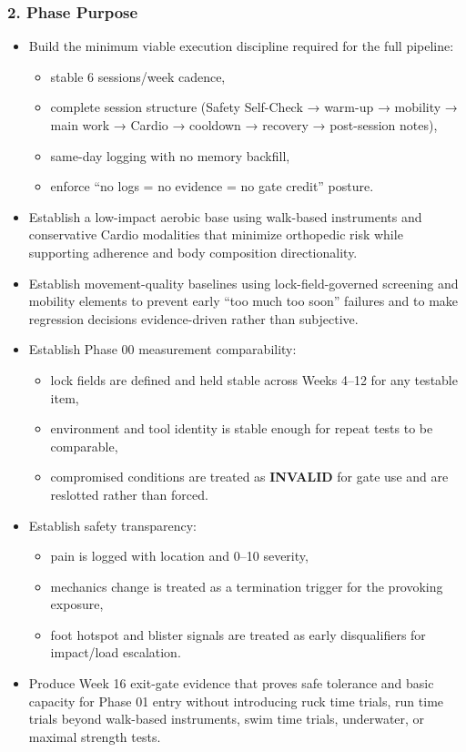 \documentclass[10pt]{article}
\begin{document}
\subsubsection*{2. Phase Purpose}

\begin{itemize}
\item Build the minimum viable execution discipline required for the full pipeline:
  \begin{itemize}
  \item stable 6 sessions/week cadence,
  \item complete session structure (Safety Self-Check → warm-up → mobility → main work → Cardio → cooldown → recovery → post-session notes),
  \item same-day logging with no memory backfill,
  \item enforce “no logs = no evidence = no gate credit” posture.
  \end{itemize}

\item Establish a low-impact aerobic base using walk-based instruments and conservative Cardio modalities that minimize orthopedic risk while supporting adherence and body composition directionality.

\item Establish movement-quality baselines using lock-field-governed screening and mobility elements to prevent early “too much too soon” failures and to make regression decisions evidence-driven rather than subjective.

\item Establish Phase 00 measurement comparability:
  \begin{itemize}
  \item lock fields are defined and held stable across Weeks 4–12 for any testable item,
  \item environment and tool identity is stable enough for repeat tests to be comparable,
  \item compromised conditions are treated as \textbf{INVALID} for gate use and are reslotted rather than forced.
  \end{itemize}

\item Establish safety transparency:
  \begin{itemize}
  \item pain is logged with location and 0–10 severity,
  \item mechanics change is treated as a termination trigger for the provoking exposure,
  \item foot hotspot and blister signals are treated as early disqualifiers for impact/load escalation.
  \end{itemize}

\item Produce Week 16 exit-gate evidence that proves safe tolerance and basic capacity for Phase 01 entry without introducing ruck time trials, run time trials beyond walk-based instruments, swim time trials, underwater, or maximal strength tests.
\end{itemize}
\end{document}
